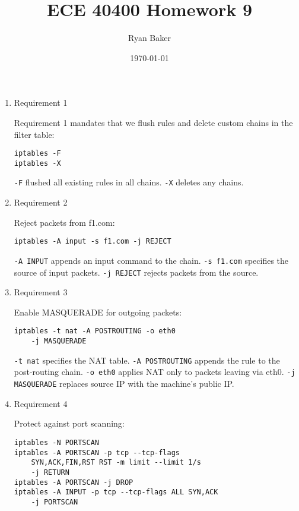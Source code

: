 \documentclass{article}
\title{ECE 40400 Homework 9}
\date{\today}
\author{Ryan Baker}
\begin{document}
\maketitle

\begin{enumerate}

\item Requirement 1

\noindent
Requirement 1 mandates that we flush rules and delete custom chains in the filter table:

\begin{lstlisting}[basicstyle=\ttfamily,frame=single]
iptables -F
iptables -X
\end{lstlisting}

\noindent
\texttt{-F} flushed all existing rules in all chains. \texttt{-X} deletes any chains.

\item Requirement 2

\noindent
Reject packets from f1.com:

\begin{lstlisting}[basicstyle=\ttfamily,frame=single]
iptables -A input -s f1.com -j REJECT
\end{lstlisting}

\noindent
\texttt{-A INPUT} appends an input command to the chain. \texttt{-s f1.com} specifies the source of input packets. \texttt{-j REJECT} rejects packets from the source.

\item Requirement 3

\noindent

Enable MASQUERADE for outgoing packets:

\begin{lstlisting}[basicstyle=\ttfamily,frame=single]
iptables -t nat -A POSTROUTING -o eth0
	-j MASQUERADE
\end{lstlisting}

\noindent
\texttt{-t nat} specifies the NAT table.
\texttt{-A POSTROUTING} appends the rule to the post-routing chain.
\texttt{-o eth0} applies NAT only to packets leaving via eth0.
\texttt{-j MASQUERADE} replaces source IP with the machine's public IP.

\item Requirement 4

\noindent
Protect against port scanning:

\begin{lstlisting}[basicstyle=\ttfamily,frame=single]
iptables -N PORTSCAN
iptables -A PORTSCAN -p tcp --tcp-flags
	SYN,ACK,FIN,RST RST -m limit --limit 1/s
	-j RETURN
iptables -A PORTSCAN -j DROP
iptables -A INPUT -p tcp --tcp-flags ALL SYN,ACK
	-j PORTSCAN


\end{lstlisting}
\end{enumerate}
\end{document}
